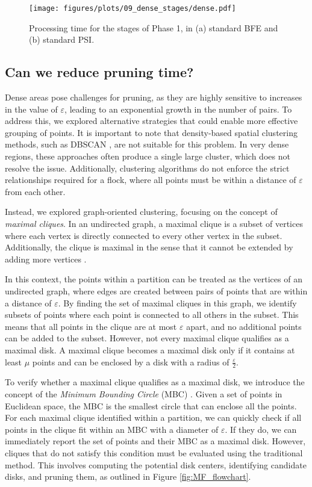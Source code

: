\begin{figure}
    \centering
    \texttt{[image: figures/plots/09\_dense\_stages/dense.pdf]} 
    \caption{Processing time for the stages of Phase 1, in (a) standard BFE and (b) standard  PSI.}\label{fig:dense_stages}
\end{figure}

\subsection{Can we reduce pruning time?}
Dense areas pose challenges for pruning, as they are highly sensitive to increases in the value of $\varepsilon$, leading to an exponential growth in the number of pairs. To address this, we explored alternative strategies that could enable more effective grouping of points. It is important to note that density-based spatial clustering methods, such as DBSCAN \cite{dbscan}, are not suitable for this problem. In very dense regions, these approaches often produce a single large cluster, which does not resolve the issue. Additionally, clustering algorithms do not enforce the strict relationships required for a flock, where all points must be within a distance of $\varepsilon$ from each other.

Instead, we explored graph-oriented clustering, focusing on the concept of \textit{maximal cliques}. In an undirected graph, a maximal clique is a subset of vertices where each vertex is directly connected to every other vertex in the subset. Additionally, the clique is maximal in the sense that it cannot be extended by adding more vertices \cite{tomita_clique_2013, bron_algorithm_1973}.

In this context, the points within a partition can be treated as the vertices of an undirected graph, where edges are created between pairs of points that are within a distance of $\varepsilon$. By finding the set of maximal cliques in this graph, we identify subsets of points where each point is connected to all others in the subset. This means that all points in the clique are at most $\varepsilon$ apart, and no additional points can be added to the subset.
However, not every maximal clique qualifies as a maximal disk. A maximal clique becomes a maximal disk only if it contains at least $\mu$ points and can be enclosed by a disk with a radius of $\frac{\varepsilon}{2}$.

To verify whether a maximal clique qualifies as a maximal disk, we introduce the concept of the \textit{Minimum Bounding Circle} (MBC) \cite{welzl_mbc_1991}. Given a set of points in Euclidean space, the MBC is the smallest circle that can enclose all the points. For each maximal clique identified within a partition, we can quickly check if all points in the clique fit within an MBC with a diameter of $\varepsilon$. If they do, we can immediately report the set of points and their MBC as a maximal disk.  However, cliques that do not satisfy this condition must be evaluated using the traditional method. This involves computing the potential disk centers, identifying candidate disks, and pruning them, as outlined in Figure \ref{fig:MF_flowchart}.

